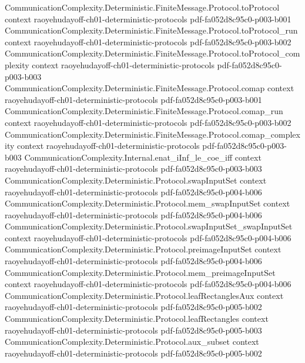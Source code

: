 \begin{lemma}
\proofstep
  {CommunicationComplexity.Deterministic.FiniteMessage.Protocol.toProtocol}
  {context}
  {raoyehudayoff-ch01-deterministic-protocols}
  {pdf-fa052d8c95c0-p003-b001}
\proofstep
  {CommunicationComplexity.Deterministic.FiniteMessage.Protocol.toProtocol_run}
  {context}
  {raoyehudayoff-ch01-deterministic-protocols}
  {pdf-fa052d8c95c0-p003-b002}
\proofstep
  {CommunicationComplexity.Deterministic.FiniteMessage.Protocol.toProtocol_complexity}
  {context}
  {raoyehudayoff-ch01-deterministic-protocols}
  {pdf-fa052d8c95c0-p003-b003}
\proofstep
  {CommunicationComplexity.Deterministic.FiniteMessage.Protocol.comap}
  {context}
  {raoyehudayoff-ch01-deterministic-protocols}
  {pdf-fa052d8c95c0-p003-b001}
\proofstep
  {CommunicationComplexity.Deterministic.FiniteMessage.Protocol.comap_run}
  {context}
  {raoyehudayoff-ch01-deterministic-protocols}
  {pdf-fa052d8c95c0-p003-b002}
\proofstep
  {CommunicationComplexity.Deterministic.FiniteMessage.Protocol.comap_complexity}
  {context}
  {raoyehudayoff-ch01-deterministic-protocols}
  {pdf-fa052d8c95c0-p003-b003}
\proofstep
  {CommunicationComplexity.Internal.enat_iInf_le_coe_iff}
  {context}
  {raoyehudayoff-ch01-deterministic-protocols}
  {pdf-fa052d8c95c0-p003-b003}
\proofstep
  {CommunicationComplexity.Deterministic.Protocol.swapInputSet}
  {context}
  {raoyehudayoff-ch01-deterministic-protocols}
  {pdf-fa052d8c95c0-p004-b006}
\proofstep
  {CommunicationComplexity.Deterministic.Protocol.mem_swapInputSet}
  {context}
  {raoyehudayoff-ch01-deterministic-protocols}
  {pdf-fa052d8c95c0-p004-b006}
\proofstep
  {CommunicationComplexity.Deterministic.Protocol.swapInputSet_swapInputSet}
  {context}
  {raoyehudayoff-ch01-deterministic-protocols}
  {pdf-fa052d8c95c0-p004-b006}
\proofstep
  {CommunicationComplexity.Deterministic.Protocol.preimageInputSet}
  {context}
  {raoyehudayoff-ch01-deterministic-protocols}
  {pdf-fa052d8c95c0-p004-b006}
\proofstep
  {CommunicationComplexity.Deterministic.Protocol.mem_preimageInputSet}
  {context}
  {raoyehudayoff-ch01-deterministic-protocols}
  {pdf-fa052d8c95c0-p004-b006}
\proofstep
  {CommunicationComplexity.Deterministic.Protocol.leafRectanglesAux}
  {context}
  {raoyehudayoff-ch01-deterministic-protocols}
  {pdf-fa052d8c95c0-p005-b002}
\proofstep
  {CommunicationComplexity.Deterministic.Protocol.leafRectangles}
  {context}
  {raoyehudayoff-ch01-deterministic-protocols}
  {pdf-fa052d8c95c0-p005-b003}
\proofstep
  {CommunicationComplexity.Deterministic.Protocol.aux_subset}
  {context}
  {raoyehudayoff-ch01-deterministic-protocols}
  {pdf-fa052d8c95c0-p005-b002}
\proofstep

\end{lemma}
